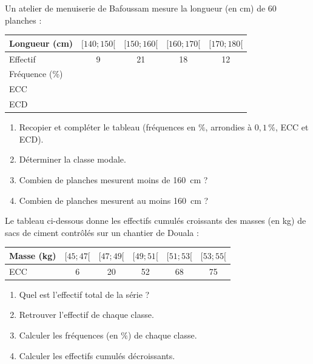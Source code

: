 \documentclass[11pt]{article}
\begin{document}
\begin{exercice}
Un atelier de menuiserie de Bafoussam mesure la longueur (en cm) de $60$ planches :
\begin{center}
\begin{tabular}{|l|c|c|c|c|}
\hline
Longueur (cm) & $[140 ; 150[$ & $[150 ; 160[$ & $[160 ; 170[$ & $[170 ; 180[$ \\
\hline
Effectif & 9 & 21 & 18 & 12 \\
\hline
Fréquence (\%) & & & & \\
\hline
ECC & & & & \\
\hline
ECD & & & & \\
\hline
\end{tabular}
\end{center}
\begin{enumerate}
\item Recopier et compléter le tableau (fréquences en $\%$, arrondies à $0,1\,\%$, ECC et ECD).
\item Déterminer la classe modale.
\item Combien de planches mesurent moins de \SI{160}{cm} ?
\item Combien de planches mesurent au moins \SI{160}{cm} ?
\end{enumerate}
\end{exercice}

\begin{exercice}
Le tableau ci-dessous donne les effectifs cumulés croissants des masses (en kg) de sacs de ciment contrôlés sur un chantier de Douala :
\begin{center}
\begin{tabular}{|l|c|c|c|c|c|}
\hline
Masse (kg) & $[45 ; 47[$ & $[47 ; 49[$ & $[49 ; 51[$ & $[51 ; 53[$ & $[53 ; 55[$ \\
\hline
ECC & 6 & 20 & 52 & 68 & 75 \\
\hline
\end{tabular}
\end{center}
\begin{enumerate}
\item Quel est l'effectif total de la série ?
\item Retrouver l'effectif de chaque classe.
\item Calculer les fréquences (en $\%$) de chaque classe.
\item Calculer les effectifs cumulés décroissants.
\end{enumerate}
\end{exercice}
\end{document}
